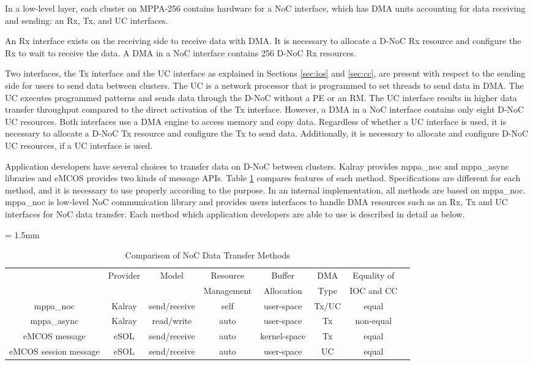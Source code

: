 In a low-level layer, each cluster on MPPA-256 contains hardware for a NoC interface, which has DMA units accounting for data receiving and sending: an Rx, Tx, and UC interfaces.

An Rx interface exists on the receiving side to receive data with DMA.
It is necessary to allocate a D-NoC Rx resource and configure the Rx to wait to receive the data.
A DMA in a NoC interface contains 256 D-NoC Rx resources.

Two interfaces, the Tx interface and the UC interface as explained in Sections \ref{sec:ios} and \ref{sec:cc},
are present with respect to the sending side for users to send data between clusters.
The UC is a network processor that is programmed to set threads to send data in DMA.
The UC executes programmed patterns and sends data through the D-NoC without a PE or an RM.
The UC interface results in higher data transfer throughput compared to the direct activation of the Tx interface.
However, a DMA in a NoC interface contains only eight D-NoC UC resources.
Both interfaces use a DMA engine to access memory and copy data.
Regardless of whether a UC interface is used, it is necessary to allocate a D-NoC Tx resource and configure the Tx to send data.
Additionally, it is necessary to allocate and configure D-NoC UC resources, if a UC interface is used.

Application developers have several choices to transfer data on D-NoC between clusters.
Kalray provides mppa\_noc and mppa\_async libraries and eMCOS provides two kinds of message APIs.
Table \ref{tb:comparison_noc} compares features of each method.
Specifications are different for each method, and it is necessary to use properly according to the purpose.
In an internal implementation, all methods are based on mppa\_noc.
mppa\_noc is low-level NoC communication library and provides users interfaces to handle DMA resources such as an Rx, Tx and UC interfaces for NoC data transfer.
Each method which application developers are able to use is described in detail as below.

\begin{table}[!htbp]
  \caption{\label{tb:comparison_noc}
    Comparison of NoC Data Transfer Methods}
  \centering
  \scriptsize	                    %
  \tabcolsep = 1.5mm              %
  \begin{tabular}{c|ccccccc}
    \hline
    & \multirow{2}{*}{Provider} & \multirow{2}{*}{Model} & Resource & Buffer & DMA & Equality of \\
    & & & Management & Allocation & Type & IOC and CC \\
    \hline
    \hline
    mppa\_noc & Kalray & send/receive & self & user-space & Tx/UC & equal \\
    mppa\_async & Kalray & read/write & auto & user-space & Tx & non-equal\\
    eMCOS message & eSOL & send/receive & auto & kernel-space & Tx & equal \\
    eMCOS session message & eSOL & send/receive & auto & user-space & UC & equal \\
    \hline
  \end{tabular}
\end{table}

